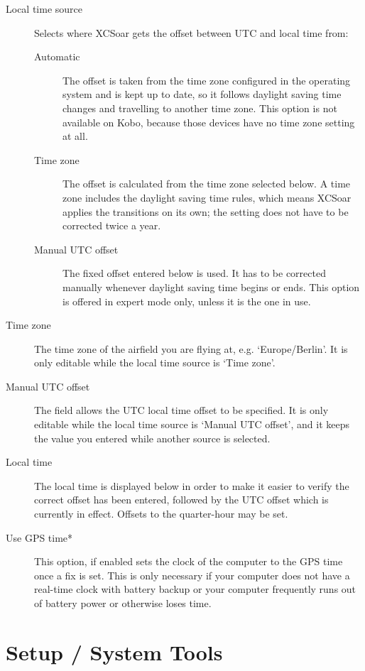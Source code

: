 \begin{description}
\item[Local time source]  Selects where XCSoar gets the offset between UTC and local
  time from:
  \begin{description}
  \item[Automatic]  The offset is taken from the time zone configured in the operating
    system and is kept up to date, so it follows daylight saving time changes and
    travelling to another time zone.  This option is not available on Kobo, because
    those devices have no time zone setting at all.
  \item[Time zone]  The offset is calculated from the time zone selected below.  A time
    zone includes the daylight saving time rules, which means XCSoar applies the
    transitions on its own; the setting does not have to be corrected twice a year.
  \item[Manual UTC offset]  The fixed offset entered below is used.  It has to be
    corrected manually whenever daylight saving time begins or ends.  This option is
    offered in expert mode only, unless it is the one in use.
  \end{description}
\item[Time zone]  The time zone of the airfield you are flying at, e.g.
  `Europe/Berlin'.  It is only editable while the local time source is `Time zone'.
\item[Manual UTC offset]  The field allows the UTC local time offset to be specified.
  It is only editable while the local time source is `Manual UTC offset', and it keeps
  the value you entered while another source is selected.
\item[Local time]  The local time is displayed below in order to make it easier to verify
  the correct offset has been entered, followed by the UTC offset which is currently in
  effect.  Offsets to the quarter-hour may be set.
\item[Use GPS time*] This option, if enabled sets the clock of the computer to 
  the GPS time once a fix is set. This is only necessary if your computer does 
  not have a real-time clock with battery backup or your computer 
  frequently runs out of battery power or otherwise loses time.
\end{description}


\section{Setup / System Tools}

